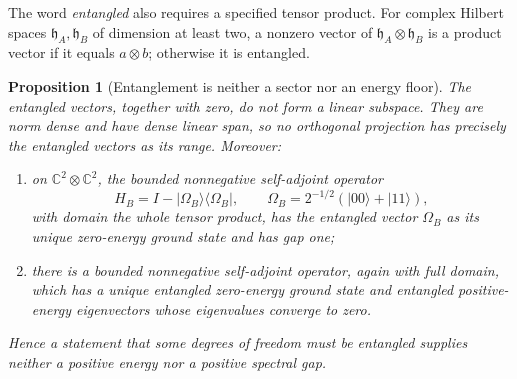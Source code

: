 \documentclass[11pt]{article}
\newtheorem{proposition}[theorem]{Proposition}
\theoremstyle{definition}
\numberwithin{equation}{section}
\begin{document}
The word \emph{entangled} also requires a specified tensor product.  For
complex Hilbert spaces \(\mathfrak h_A,\mathfrak h_B\) of dimension at least
two, a nonzero vector of \(\mathfrak h_A\otimes\mathfrak h_B\) is a product
vector if it equals \(a\otimes b\); otherwise it is entangled.

\begin{proposition}[Entanglement is neither a sector nor an energy floor]
\label{cusp-link-entanglement-no-gap}
The entangled vectors, together with zero, do not form a linear subspace.
They are norm dense and have dense linear span, so no orthogonal projection
has precisely the entangled vectors as its range.  Moreover:
\begin{enumerate}
\item on \(\mathbb C^2\otimes\mathbb C^2\), the bounded nonnegative
self-adjoint operator
\[
 H_B=I-|\Omega_B\rangle\langle\Omega_B|,
 \qquad
 \Omega_B=2^{-1/2}(|00\rangle+|11\rangle),
\]
with domain the whole tensor product, has the entangled vector \(\Omega_B\)
as its unique zero-energy ground state and has gap one;
\item there is a bounded nonnegative self-adjoint operator, again with full
domain, which has a unique entangled zero-energy ground state and entangled
positive-energy eigenvectors whose eigenvalues converge to zero.
\end{enumerate}
Hence a statement that some degrees of freedom must be entangled supplies
neither a positive energy nor a positive spectral gap.
\end{proposition}
\end{document}
